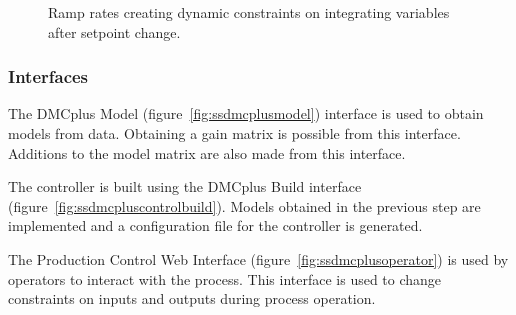 \begin{figure}[htbp]
  \centering
  \scalebox{1}{}  
  \caption[DMCplus ramp rate dynamic constraints]{Ramp rates creating dynamic constraints on integrating variables after setpoint change.}
  \label{fig:dmcplusramprates}
\end{figure}

\subsubsection{Interfaces}
The DMCplus Model (figure~\ref{fig:ssdmcplusmodel}) interface is used to obtain models from data.
Obtaining a gain matrix is possible from this interface.
Additions to the model matrix are also made from this interface.

The controller is built using the DMCplus Build interface (figure~\ref{fig:ssdmcpluscontrolbuild}).
Models obtained in the previous step are implemented and a configuration file for the controller is generated.

The Production Control Web Interface (figure~\ref{fig:ssdmcplusoperator}) is used by operators to interact with the process.
This interface is used to change constraints on inputs and outputs during process operation.



